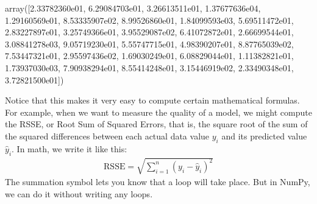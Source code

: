 \documentclass[letterpaper,10pt,english]{sphinxmanual}
\begin{document}
\begin{sphinxVerbatim}[commandchars=\\\{\}]
   
\end{sphinxVerbatim}

\begin{sphinxVerbatim}[commandchars=\\\{\}]
array([2.33782360e\PYGZhy{}01, 6.29084703e\PYGZhy{}01, 3.26613511e\PYGZhy{}01, 1.37677636e\PYGZhy{}04,
       1.29160569e\PYGZhy{}01, 8.53335907e\PYGZhy{}02, 8.99526860e\PYGZhy{}01, 1.84099593e\PYGZhy{}03,
       5.69511472e\PYGZhy{}01, 2.83227897e\PYGZhy{}01, 3.25749366e\PYGZhy{}01, 3.95529087e\PYGZhy{}02,
       6.41072872e\PYGZhy{}01, 2.66699544e\PYGZhy{}01, 3.08841278e\PYGZhy{}03, 9.05719230e\PYGZhy{}01,
       5.55747715e\PYGZhy{}01, 4.98390207e\PYGZhy{}01, 8.87765039e\PYGZhy{}02, 7.53447321e\PYGZhy{}01,
       2.95597436e\PYGZhy{}02, 1.69030249e\PYGZhy{}01, 6.08829044e\PYGZhy{}01, 1.11382821e\PYGZhy{}01,
       1.73937030e\PYGZhy{}03, 7.90938294e\PYGZhy{}01, 8.55414248e\PYGZhy{}01, 3.15446919e\PYGZhy{}02,
       2.33490348e\PYGZhy{}01, 3.72821500e\PYGZhy{}01])
\end{sphinxVerbatim}

Notice that this makes it very easy to compute certain mathematical formulas.  For example, when we want to measure the quality of a model, we might compute the RSSE, or Root Sum of Squared Errors, that is, the square root of the sum of the squared differences between each actual data value \(y_i\) and its predicted value \(\hat y_i\).  In math, we write it like this:
\begin{equation*}
\begin{split} \text{RSSE} = \sqrt{\sum_{i=1}^n (y_i-\hat y_i)^2} \end{split}
\end{equation*}
The summation symbol lets you know that a loop will take place.  But in NumPy, we can do it without writing any loops.

\begin{sphinxVerbatim}[commandchars=\\\{\}]
      \PYG{p}{[}      \PYG{p}{]}    
   \PYG{p}{[}      \PYG{p}{]}    
           
\end{sphinxVerbatim}
\end{document}
